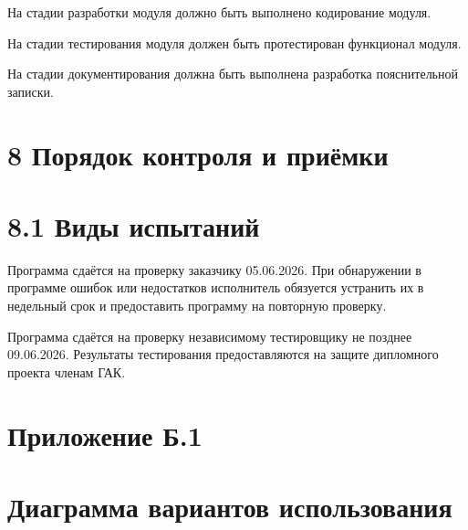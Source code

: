 На стадии разработки модуля должно быть выполнено кодирование модуля.

На стадии тестирования модуля должен быть протестирован функционал
модуля.

На стадии документирования должна быть выполнена разработка
пояснительной записки.

\section{8 Порядок контроля и
приёмки}\label{ux43fux43eux440ux44fux434ux43eux43a-ux43aux43eux43dux442ux440ux43eux43bux44f-ux438-ux43fux440ux438ux451ux43cux43aux438}

\section{8.1 Виды
испытаний}\label{ux432ux438ux434ux44b-ux438ux441ux43fux44bux442ux430ux43dux438ux439}

Программа сдаётся на проверку заказчику 05.06.2026. При обнаружении в
программе ошибок или недостатков исполнитель обязуется устранить их в
недельный срок и предоставить программу на повторную проверку.

Программа сдаётся на проверку независимому тестировщику не позднее
09.06.2026. Результаты тестирования предоставляются на защите дипломного
проекта членам ГАК.

\section{\texorpdfstring{\hfill\break
}{ }}\label{section}

\section{Приложение
Б.1}\label{ux43fux440ux438ux43bux43eux436ux435ux43dux438ux435-ux431.1}

\section{}\label{section-1}

\section{Диаграмма вариантов
использования}\label{ux434ux438ux430ux433ux440ux430ux43cux43cux430-ux432ux430ux440ux438ux430ux43dux442ux43eux432-ux438ux441ux43fux43eux43bux44cux437ux43eux432ux430ux43dux438ux44f}


